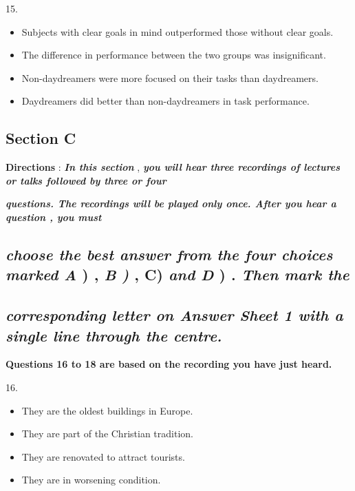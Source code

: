 \documentclass[UTF8,11pt]{ctexart}
\begin{document}
15.


\begin{itemize}[leftmargin=2em,itemsep=.2em,topsep=.4em]\item[A.] Subjects with clear goals in mind outperformed those without clear goals.
\end{itemize}

\begin{itemize}[leftmargin=2em,itemsep=.2em,topsep=.4em]\item[B.] The difference in performance between the two groups was insignificant.
\item[C.] Non-daydreamers were more focused on their tasks than daydreamers.
\item[D.] Daydreamers did better than non-daydreamers in task performance.
\end{itemize}

\subsection*{\textbf{Section C}}


\textbf{Directions }: \textbf{\textit{In this section }}, \textbf{\textit{you will hear three recordings of lectures or talks followed by three or four}}


\textbf{\textit{questions. The recordings will be played only once. After you hear a question , you must}}


\subsection*{\textbf{\textit{choose the best answer from the four choices marked A }}) , \textbf{\textit{B ) }}, C) \textbf{\textit{and D }}) . \textbf{\textit{Then mark the}}}


\subsection*{\textbf{\textit{corresponding letter on Answer Sheet 1 with a single line through the centre.}}}


\textbf{Questions 16 to 18 are based on the recording you have just heard.}


16.


\begin{itemize}[leftmargin=2em,itemsep=.2em,topsep=.4em]\item[A.] They are the oldest buildings in Europe.
\item[B.] They are part of the Christian tradition.
\item[C.] They are renovated to attract tourists.
\item[D.] They are in worsening condition.
\end{itemize}
\end{document}
